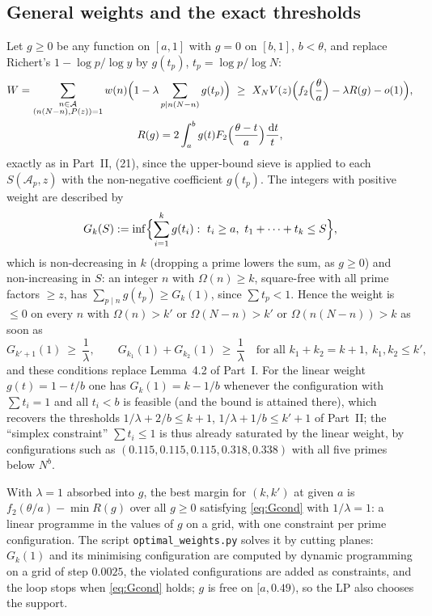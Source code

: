 \documentclass[11pt,a4paper]{article}
\theoremstyle{remark}
\theoremstyle{definition}
\newcommand{\cA}{\mathcal A}
\newcommand{\dd}{\,\mathrm d}
\begin{document}
\subsection{General weights and the exact thresholds}
Let $g\ge0$ be any function on $[a,1]$ with $g=0$ on $[b,1]$, $b<\theta$, and replace Richert's $1-\log p/\log y$ by $g(t_p)$, $t_p=\log p/\log N$:
\begin{gather*}
W=\sum_{\substack{n\in\cA\\ (n(N-n),P(z))=1}}w(n)\Bigl(1-\lambda\sum_{p\mid n(N-n)}g(t_p)\Bigr)\ \ge\ X_NV(z)\Bigl(f_2\Bigl(\frac\theta a\Bigr)-\lambda R(g)-o(1)\Bigr),\\
R(g)=2\int_a^bg(t)F_2\Bigl(\frac{\theta-t}a\Bigr)\frac{\dd t}t,
\end{gather*}
exactly as in Part~II, (21), since the upper-bound sieve is applied to each $S(\cA_p,z)$ with the non-negative coefficient $g(t_p)$. The integers with positive weight are described by
\[
G_k(S):=\inf\Bigl\{\sum_{i=1}^kg(t_i):\ t_i\ge a,\ t_1+\cdots+t_k\le S\Bigr\},
\]
which is non-decreasing in $k$ (dropping a prime lowers the sum, as $g\ge0$) and non-increasing in $S$: an integer $n$ with $\Omega(n)\ge k$, square-free with all prime factors $\ge z$, has $\sum_{p\mid n}g(t_p)\ge G_k(1)$, since $\sum t_p<1$. Hence the weight is $\le0$ on every $n$ with $\Omega(n)>k'$ or $\Omega(N-n)>k'$ or $\Omega(n(N-n))>k$ as soon as
\begin{equation}\label{eq:Gcond}
G_{k'+1}(1)\ \ge\ \frac1\lambda,\qquad G_{k_1}(1)+G_{k_2}(1)\ \ge\ \frac1\lambda\quad\text{for all }k_1+k_2=k+1,\ k_1,k_2\le k',
\end{equation}
and these conditions replace Lemma~4.2 of Part~I. For the linear weight $g(t)=1-t/b$ one has $G_k(1)=k-1/b$ whenever the configuration with $\sum t_i=1$ and all $t_i<b$ is feasible (and the bound is attained there), which recovers the thresholds $1/\lambda+2/b\le k+1$, $1/\lambda+1/b\le k'+1$ of Part~II; the ``simplex constraint'' $\sum t_i\le1$ is thus already saturated by the linear weight, by configurations such as $(0.115,0.115,0.115,0.318,0.338)$ with all five primes below $N^b$.

With $\lambda=1$ absorbed into $g$, the best margin for $(k,k')$ at given $a$ is $f_2(\theta/a)-\min R(g)$ over all $g\ge0$ satisfying \eqref{eq:Gcond} with $1/\lambda=1$: a linear programme in the values of $g$ on a grid, with one constraint per prime configuration. The script \texttt{optimal\_weights.py} solves it by cutting planes: $G_k(1)$ and its minimising configuration are computed by dynamic programming on a grid of step $0.0025$, the violated configurations are added as constraints, and the loop stops when \eqref{eq:Gcond} holds; $g$ is free on $[a,0.49)$, so the LP also chooses the support.
\end{document}
